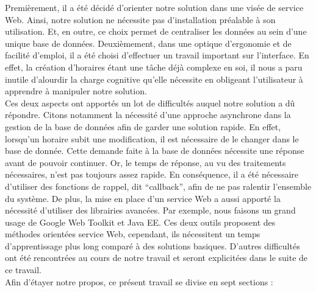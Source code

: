 \newline
\indent
Premièrement, il a été décidé d'orienter notre solution dans une visée de service Web. Ainsi, notre solution ne nécessite pas d'installation préalable à son utilisation. Et, en outre, ce choix permet de centraliser les données au sein d'une unique base de données.
\newline
\indent
Deuxièmement, dans une optique d'ergonomie et de facilité d'emploi, il a été choisi d'effectuer un travail important sur l'interface. En effet, la création d'horaires étant une tâche déjà complexe en soi, il nous a paru inutile d'alourdir la charge cognitive qu'elle nécessite en obligeant l'utilisateur à apprendre à manipuler notre solution.\\
\newline
\indent
Ces deux aspects ont apportés un lot de difficultés auquel notre solution a dû répondre. Citons notamment la nécessité d'une approche asynchrone dans la gestion de la base de données afin de garder une solution rapide. En effet, lorsqu'un horaire subit une modification, il est nécessaire de le changer dans le base de donnée. Cette demande faite à la base de données nécessite une réponse avant de pouvoir continuer. Or, le temps de réponse, au vu des traitements nécessaires, n'est pas toujours  assez rapide. En conséquence, il a été nécessaire d'utiliser des fonctions de rappel, dit \enquote{callback}, afin de ne pas ralentir l'ensemble du système.
\newline
\indent
De plus, la mise en place d'un service Web a aussi apporté la nécessité d'utiliser des librairies avancées. Par exemple, nous faisons un grand usage de Google Web Toolkit et Java EE. Ces deux outils proposent des méthodes orientées service Web, cependant, ils nécessitent un temps d'apprentissage plus long comparé à des solutions basiques.
\newline
\indent
D'autres difficultés ont été rencontrées au cours de notre travail et seront explicitées dans le suite de ce travail.\\
\newline
\indent
Afin d'étayer notre propos, ce présent travail se divise en sept sections :
